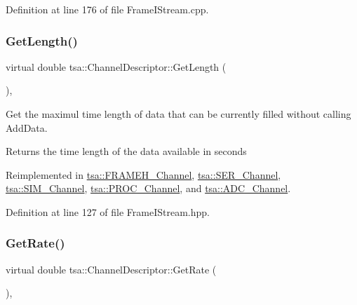 Definition at line 176 of file Frame\+I\+Stream.\+cpp.

\mbox{\label{classtsa_1_1_channel_descriptor_a456d14e6136c389fbd307fabab7d7b73}} 
\subsubsection{\texorpdfstring{Get\+Length()}{GetLength()}}
{\footnotesize\ttfamily virtual double tsa\+::\+Channel\+Descriptor\+::\+Get\+Length (\begin{DoxyParamCaption}{ }\end{DoxyParamCaption})\hspace{0.3cm}{\ttfamily [inline]}, {\ttfamily [virtual]}}

Get the maximul time length of data that can be currently filled without calling Add\+Data.

\begin{DoxyReturn}{Returns}
the time length of the data available in seconds 
\end{DoxyReturn}


Reimplemented in \hyperlink{classtsa_1_1_f_r_a_m_e_h___channel_a022b134fb62d99e8cb00a6ce28b2d569}{tsa\+::\+F\+R\+A\+M\+E\+H\+\_\+\+Channel}, \hyperlink{classtsa_1_1_s_e_r___channel_ac2cb2ded2f417590ed1da5c5e2315569}{tsa\+::\+S\+E\+R\+\_\+\+Channel}, \hyperlink{classtsa_1_1_s_i_m___channel_a99941fc8df0c8bbc32091e7e87d20de8}{tsa\+::\+S\+I\+M\+\_\+\+Channel}, \hyperlink{classtsa_1_1_p_r_o_c___channel_ac29ae55cbededca3814b30e1186a4650}{tsa\+::\+P\+R\+O\+C\+\_\+\+Channel}, and \hyperlink{classtsa_1_1_a_d_c___channel_ab5e23c219a7bf70866b05c9d3ad3da6f}{tsa\+::\+A\+D\+C\+\_\+\+Channel}.



Definition at line 127 of file Frame\+I\+Stream.\+hpp.

\mbox{\label{classtsa_1_1_channel_descriptor_a602c501d3fa47c0951ae45f78336a1a8}} 
\subsubsection{\texorpdfstring{Get\+Rate()}{GetRate()}}
{\footnotesize\ttfamily virtual double tsa\+::\+Channel\+Descriptor\+::\+Get\+Rate (\begin{DoxyParamCaption}{ }\end{DoxyParamCaption})\hspace{0.3cm}{\ttfamily [inline]}, {\ttfamily [virtual]}}

